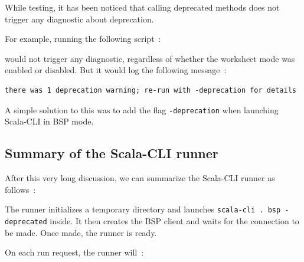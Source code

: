 \documentclass{article}
\begin{document}
While testing, it has been noticed that calling deprecated methods does not trigger any diagnostic about deprecation.

For example, running the following script~:



would not trigger any diagnostic, regardless of whether the worksheet mode was enabled or disabled. But it would log the following message~:

\begin{lstlisting}
there was 1 deprecation warning; re-run with -deprecation for details
\end{lstlisting}

A simple solution to this was to add the flag \lstinline{-deprecation} when launching Scala-CLI in BSP mode.

\subsection{Summary of the Scala-CLI runner}

After this very long discussion, we can summarize the Scala-CLI runner as follows~:

The runner initializes a temporary directory and launches \lstinline{scala-cli . bsp -deprecated} inside. It then creates the BSP client and
waits for the connection to be made. Once made, the runner is ready.

On each run request, the runner will~:
\end{document}
